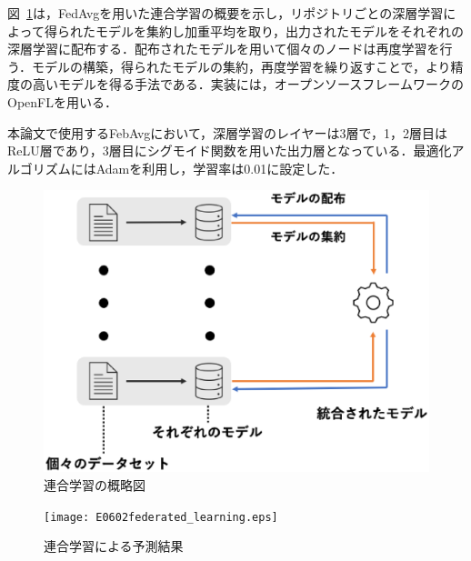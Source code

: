 \documentclass[uplatex,dvipdfmx,a4paper,twocolumn,base=11pt,jbase=11pt,ja=standard]{bxjsarticle}  %
\begin{document}
図~\ref{fig:explain}は，FedAvgを用いた連合学習の概要を示し，リポジトリごとの深層学習によって得られたモデルを集約し加重平均を取り，出力されたモデルをそれぞれの深層学習に配布する．配布されたモデルを用いて個々のノードは再度学習を行う．モデルの構築，得られたモデルの集約，再度学習を繰り返すことで，より精度の高いモデルを得る手法である．実装には，オープンソースフレームワークのOpenFLを用いる．

本論文で使用するFebAvgにおいて，深層学習のレイヤーは3層で，1，2層目はReLU層であり，3層目にシグモイド関数を用いた出力層となっている．最適化アルゴリズムにはAdamを利用し，学習率は0.01に設定した．



\setlength\floatsep{5pt}
\setlength\textfloatsep{10pt}

\begin{figure}
\begin{center}
\includegraphics[width=0.9\linewidth]{federated_learning_exp.eps}
\caption{連合学習の概略図}
\label{fig:explain}
\end{center}
\end{figure}

\begin{figure}
\begin{center}
\texttt{[image: E0602federated\_learning.eps]}
\caption{連合学習による予測結果}
\label{fig:fed}
\end{center}
\end{figure}
\end{document}
